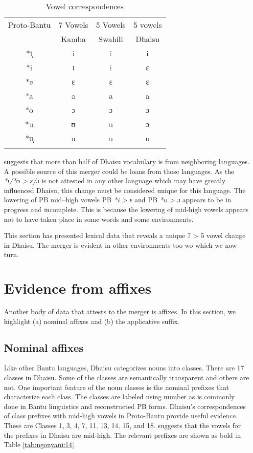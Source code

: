 \documentclass[output=paper,colorlinks,citecolor=brown]{langscibook}
\begin{document}
\begin{table}
	\caption{Vowel correspondences} 
    \label{tab:ngonyani:13}
    \begin{tabular}{c c c c}
    \lsptoprule
        Proto-Bantu &	7 Vowels	& 5 Vowels & 5 vowels\\
         & Kamba & Swahili & Dhaisu \\
    \midrule
        *i̧ & i & i & i\\
        *i & ɪ & i & ɛ \\
        *e & ɛ & ɛ & ɛ \\
        *a & a & a & a \\
        *o & ɔ & ɔ & ɔ \\
        *u & ʊ & u & ɔ\\
        *u̧ & u & u & u \\
    \lspbottomrule
    \end{tabular}
\end{table}
\cite[20]{Nurse2000} suggests that more than half of Dhaisu vocabulary is from neighboring languages. A possible source of this merger could be loans from those languages. As the  \textit{*ɪ/*ʊ > ɛ/ɔ} is not attested in any other language which may have greatly influenced Dhaisu, this change must be considered unique for this language. The lowering of PB mid–high vowels  PB \textit{*i > ɛ} and PB \textit{*u > ɔ} appears to be in progress and incomplete. This is because the lowering of mid-high vowels appears not to have taken place in some words and some environments. 

This section has presented lexical data that reveals a unique 7 > 5 vowel change in Dhaisu. The merger is evident in other environments too wo which we now turn. 

\section{Evidence from affixes}\label{sec:ngonyani:4}

Another body of data that attests to the merger is affixes. In this section, we highlight (a) nominal affixes and (b) the applicative suffix.

\subsection{Nominal affixes}\label{sec:ngonyani:4.1}

Like other Bantu languages, Dhaisu categorizes nouns into classes. There are 17 classes in Dhaisu. Some of the classes are semantically transparent and others are not. One important feature of the noun classes is the nominal prefixes that characterize each class. The classes are labeled using number as is commonly done in Bantu linguistics and reconstructed PB forms. Dhaisu’s correspondences of class prefixes with mid-high vowels in Proto-Bantu provide useful evidence. These are Classes 1, 3, 4, 7, 11, 13, 14, 15, and 18.  \cite[22]{Nurse2000} suggests that the vowels for the prefixes in Dhaisu are mid-high. The relevant prefixes are shown as bold in Table \ref{tab:ngonyani:14}.
\end{document}
